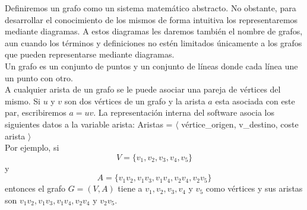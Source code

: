 Definiremos un grafo como un sistema matemático abstracto. No obstante, para desarrollar el conocimiento de los mismos de forma intuitiva los representaremos mediante diagramas. A estos diagramas les daremos también el nombre de grafos, aun cuando los términos y definiciones no estén limitados únicamente a los grafos que pueden representarse mediante diagramas.\\

Un grafo es un conjunto de puntos y un conjunto de líneas donde cada línea une un punto con otro. \\

A cualquier arista de un grafo se le puede asociar una pareja de vértices del mismo. Si $u$ y $v$ son dos vértices de un grafo y la arista $a$ esta asociada con este par, escribiremos $a = uv$. La representación interna del software asocia los siguientes datos a la variable arista: Aristas = $\langle$ vértice\_origen, v\_destino, coste arista $\rangle$\\

Por ejemplo, si\\
\[ V = \{v_1, v_2, v_3, v_4, v_5\} \]
y\\
\[ A = \{v_1v_2, v_1v_3, v_1v_4, v_2v_4, v_2v_5\} \]
entonces el grafo $G = (V,A)$ tiene a $v_1, v_2, v_3, v_4$ y $v_5$ como vértices y sus aristas son $v_1v_2, v_1v_3, v_1v_4, v_2v_4$ y $v_2v_5$.\\

